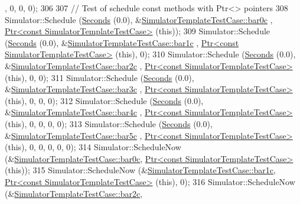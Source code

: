 \begin{DoxyCode}
      , 0, 0, 0);
306 
307   \textcolor{comment}{// Test of schedule const methods with Ptr<> pointers}
308   Simulator::Schedule (\hyperlink{group__timecivil_ga33c34b816f8ff6628e33d5c8e9713b9e}{Seconds} (0.0), &\hyperlink{classSimulatorTemplateTestCase_a39381dd6c298ce90120f9ca020b51a44}{SimulatorTemplateTestCase::bar0c}
      , \hyperlink{classns3_1_1Ptr}{Ptr<const SimulatorTemplateTestCase>} (\textcolor{keyword}{this}));
309   Simulator::Schedule (\hyperlink{group__timecivil_ga33c34b816f8ff6628e33d5c8e9713b9e}{Seconds} (0.0), &\hyperlink{classSimulatorTemplateTestCase_a17a705290d33ff9d9752c5fcd3ca549a}{SimulatorTemplateTestCase::bar1c}
      , \hyperlink{classns3_1_1Ptr}{Ptr<const SimulatorTemplateTestCase>} (\textcolor{keyword}{this}), 0);
310   Simulator::Schedule (\hyperlink{group__timecivil_ga33c34b816f8ff6628e33d5c8e9713b9e}{Seconds} (0.0), &\hyperlink{classSimulatorTemplateTestCase_a95e0f184170b9dd6ced11d3423752e9f}{SimulatorTemplateTestCase::bar2c}
      , \hyperlink{classns3_1_1Ptr}{Ptr<const SimulatorTemplateTestCase>} (\textcolor{keyword}{this}), 0, 0);
311   Simulator::Schedule (\hyperlink{group__timecivil_ga33c34b816f8ff6628e33d5c8e9713b9e}{Seconds} (0.0), &\hyperlink{classSimulatorTemplateTestCase_a3440409096aee7c6dda41caab7cceeb6}{SimulatorTemplateTestCase::bar3c}
      , \hyperlink{classns3_1_1Ptr}{Ptr<const SimulatorTemplateTestCase>} (\textcolor{keyword}{this}), 0, 0, 0);
312   Simulator::Schedule (\hyperlink{group__timecivil_ga33c34b816f8ff6628e33d5c8e9713b9e}{Seconds} (0.0), &\hyperlink{classSimulatorTemplateTestCase_a4d7fde0e0f8f16201cb8731a65c84188}{SimulatorTemplateTestCase::bar4c}
      , \hyperlink{classns3_1_1Ptr}{Ptr<const SimulatorTemplateTestCase>} (\textcolor{keyword}{this}), 0, 0, 0, 0);
313   Simulator::Schedule (\hyperlink{group__timecivil_ga33c34b816f8ff6628e33d5c8e9713b9e}{Seconds} (0.0), &\hyperlink{classSimulatorTemplateTestCase_af3908d1e88e554a76b7fcb7c6011182a}{SimulatorTemplateTestCase::bar5c}
      , \hyperlink{classns3_1_1Ptr}{Ptr<const SimulatorTemplateTestCase>} (\textcolor{keyword}{this}), 0, 0, 0, 0, 0);
314   Simulator::ScheduleNow (&\hyperlink{classSimulatorTemplateTestCase_a39381dd6c298ce90120f9ca020b51a44}{SimulatorTemplateTestCase::bar0c}, 
      \hyperlink{classns3_1_1Ptr}{Ptr<const SimulatorTemplateTestCase>} (\textcolor{keyword}{this}));
315   Simulator::ScheduleNow (&\hyperlink{classSimulatorTemplateTestCase_a17a705290d33ff9d9752c5fcd3ca549a}{SimulatorTemplateTestCase::bar1c}, 
      \hyperlink{classns3_1_1Ptr}{Ptr<const SimulatorTemplateTestCase>} (\textcolor{keyword}{this}), 0);
316   Simulator::ScheduleNow (&\hyperlink{classSimulatorTemplateTestCase_a95e0f184170b9dd6ced11d3423752e9f}{SimulatorTemplateTestCase::bar2c}, 

\end{DoxyCode}
